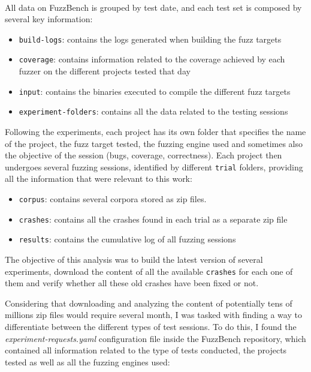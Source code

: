 \ \\
All data on FuzzBench is grouped by test date, and each test set is composed by several key information:
\begin{itemize}
    \item \verb|build-logs|: contains the logs generated when building the fuzz targets
    \item \verb|coverage|: contains information related to the coverage achieved by each fuzzer on the different projects tested that day
    \item \verb|input|: contains the binaries executed to compile the different fuzz targets
    \item \verb|experiment-folders|: contains all the data related to the testing sessions
\end{itemize}

Following the experiments, each project has its own folder that specifies the name of the project, the fuzz target tested, the fuzzing engine used and sometimes also the objective of the session (bugs, coverage, correctness). Each project then undergoes several fuzzing sessions, identified by different \verb|trial| folders, providing all the information that were relevant to this work:
\begin{itemize}
    \item \verb|corpus|: contains several corpora stored as zip files.
    \item \verb|crashes|: contains all the crashes found in each trial as a separate zip file
    \item \verb|results|: contains the cumulative log of all fuzzing sessions
\end{itemize}


The objective of this analysis was to build the latest version of several experiments, download the content of all the available \verb|crashes| for each one of them and verify whether all these old crashes have been fixed or not.

Considering that downloading and analyzing the content of potentially tens of millions zip files would require several month, I was tasked with finding a way to differentiate between the different types of test sessions.
To do this, I found the \textit{experiment-requests.yaml} configuration file \cite{exp_yaml} inside the FuzzBench repository, which contained
all information related to the type of tests conducted, the projects tested as well as all the fuzzing engines used:

